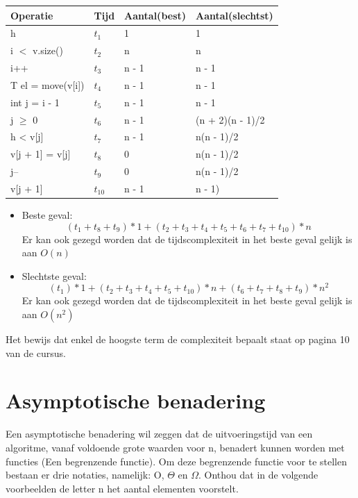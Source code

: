 \documentclass[12pt]{report}
\newcommand{\note}[1]{
  \color{violet}#1 \color{black}
}
\begin{document}
\begin{tabular}{|l | l |l |l|}
  \hline
  Operatie          & Tijd  & Aantal(best) & Aantal(slechtst)  \\
  \hline
  h           & $t_1$ & 1            & 1                 \\
  i $<$ v.size()      & $t_2$ & n            & n                 \\
  i++               & $t_3$ & n - 1        & n - 1             \\
  T el = move(v[i]) & $t_4$ & n - 1        & n - 1             \\
  int j = i - 1     & $t_5$ & n - 1        & n - 1             \\
  j $\geq$ 0        & $t_6$ & n - 1        & (n + 2)(n - 1)/2  \\
  h < v[j]          & $t_7$ & n - 1        & n(n - 1)/2        \\
  v[j + 1] = v[j]   & $t_8$ & 0            & n(n - 1)/2        \\
  j--               & $t_9$ & 0            & n(n - 1)/2        \\
  v[j + 1]          & $t_10$ & n - 1            & n - 1)        \\
  \hline
\end{tabular}
\newline
\begin{itemize}
 \item Beste geval: $$(t_1 + t_8 + t_9) * 1 + (t_2 + t_3 + t_4 + t_5 + t_6 + t_7 + t_{10}) * n$$
Er kan ook gezegd worden dat de tijdscomplexiteit in het beste geval gelijk is aan $O(n)$
\item Slechtste geval: $$(t_1) * 1 + (t_2 + t_3 + t_4 + t_5 + t_{10}) * n + (t_6 + t_7 + t_8 + t_9) * n^2$$
Er kan ook gezegd worden dat de tijdscomplexiteit in het beste geval gelijk is aan $O(n^2)$
\end{itemize}
Het bewijs dat enkel de hoogste term de complexiteit bepaalt staat op pagina 10 van de cursus.
\section{Asymptotische benadering}
Een asymptotische benadering wil zeggen dat de uitvoeringstijd van een algoritme, vanaf voldoende grote waarden voor n, benadert kunnen worden met functies (Een begrenzende functie). Om deze begrenzende functie voor te stellen bestaan er drie notaties, namelijk: O, $\Theta$ en $\Omega$.
Onthou dat in de volgende voorbeelden de letter\note{n} het aantal elementen voorstelt.
\end{document}
